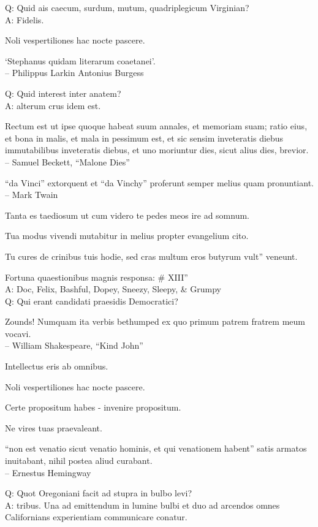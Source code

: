 \documentclass[titlepage,12pt]{memoir}
\begin{document}
Q: Quid ais caecum, surdum, mutum, quadriplegicum Virginian?\\
A: Fidelis.

Noli vespertiliones hac nocte pascere.

‘Stephanus quidam literarum coaetanei’.
\\-- Philippus Larkin Antonius Burgess

Q: Quid interest inter anatem?\\
A: alterum crus idem est.

Rectum est ut ipse quoque habeat suum annales, et memoriam suam;
ratio eius, et bona in malis, et mala in
pessimum est, et sic sensim inveteratis diebus immutabilibus inveteratis diebus, et uno moriuntur
dies, sicut alius dies, brevior.
\\-- Samuel Beckett, “Malone Dies”

“da Vinci” extorquent et “da Vinchy” proferunt
semper melius quam pronuntiant.
\\-- Mark Twain

Tanta es taediosum ut cum videro te pedes meos ire ad somnum.

Tua modus vivendi mutabitur in melius propter evangelium cito.

Tu cures de crinibus tuis hodie, sed cras multum eros butyrum vult”
veneunt.

Fortuna quaestionibus magnis responsa: \# XIII”\\
A: Doc, Felix, Bashful, Dopey, Sneezy, Sleepy, \& Grumpy
\\Q: Qui erant candidati praesidis Democratici?

Zounds! Numquam ita verbis bethumped
ex quo primum patrem fratrem meum vocavi.
\\-- William Shakespeare, “Kind John”

Intellectus eris ab omnibus.

Noli vespertiliones hac nocte pascere.

Certe propositum habes - invenire propositum.

Ne vires tuas praevaleant.

“non est venatio sicut venatio hominis, et qui venationem habent”
satis armatos inuitabant, nihil postea aliud curabant.
\\-- Ernestus Hemingway

Q: Quot Oregoniani facit ad stupra in bulbo levi?\\
A: tribus. Una ad emittendum in lumine bulbi et duo ad arcendos omnes
Californians experientiam communicare conatur.
\end{document}
